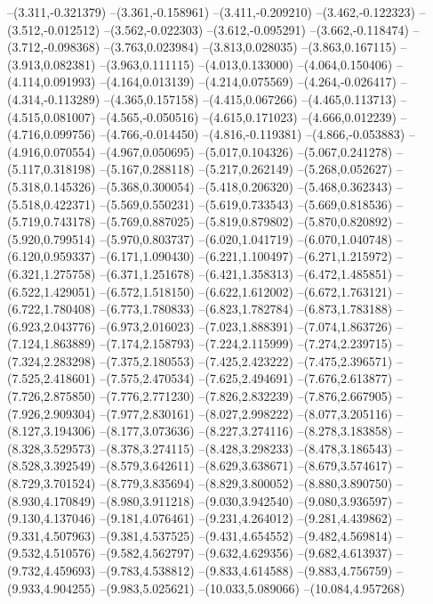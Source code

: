 --(3.311,-0.321379)
--(3.361,-0.158961)
--(3.411,-0.209210)
--(3.462,-0.122323)
--(3.512,-0.012512)
--(3.562,-0.022303)
--(3.612,-0.095291)
--(3.662,-0.118474)
--(3.712,-0.098368)
--(3.763,0.023984)
--(3.813,0.028035)
--(3.863,0.167115)
--(3.913,0.082381)
--(3.963,0.111115)
--(4.013,0.133000)
--(4.064,0.150406)
--(4.114,0.091993)
--(4.164,0.013139)
--(4.214,0.075569)
--(4.264,-0.026417)
--(4.314,-0.113289)
--(4.365,0.157158)
--(4.415,0.067266)
--(4.465,0.113713)
--(4.515,0.081007)
--(4.565,-0.050516)
--(4.615,0.171023)
--(4.666,0.012239)
--(4.716,0.099756)
--(4.766,-0.014450)
--(4.816,-0.119381)
--(4.866,-0.053883)
--(4.916,0.070554)
--(4.967,0.050695)
--(5.017,0.104326)
--(5.067,0.241278)
--(5.117,0.318198)
--(5.167,0.288118)
--(5.217,0.262149)
--(5.268,0.052627)
--(5.318,0.145326)
--(5.368,0.300054)
--(5.418,0.206320)
--(5.468,0.362343)
--(5.518,0.422371)
--(5.569,0.550231)
--(5.619,0.733543)
--(5.669,0.818536)
--(5.719,0.743178)
--(5.769,0.887025)
--(5.819,0.879802)
--(5.870,0.820892)
--(5.920,0.799514)
--(5.970,0.803737)
--(6.020,1.041719)
--(6.070,1.040748)
--(6.120,0.959337)
--(6.171,1.090430)
--(6.221,1.100497)
--(6.271,1.215972)
--(6.321,1.275758)
--(6.371,1.251678)
--(6.421,1.358313)
--(6.472,1.485851)
--(6.522,1.429051)
--(6.572,1.518150)
--(6.622,1.612002)
--(6.672,1.763121)
--(6.722,1.780408)
--(6.773,1.780833)
--(6.823,1.782784)
--(6.873,1.783188)
--(6.923,2.043776)
--(6.973,2.016023)
--(7.023,1.888391)
--(7.074,1.863726)
--(7.124,1.863889)
--(7.174,2.158793)
--(7.224,2.115999)
--(7.274,2.239715)
--(7.324,2.283298)
--(7.375,2.180553)
--(7.425,2.423222)
--(7.475,2.396571)
--(7.525,2.418601)
--(7.575,2.470534)
--(7.625,2.494691)
--(7.676,2.613877)
--(7.726,2.875850)
--(7.776,2.771230)
--(7.826,2.832239)
--(7.876,2.667905)
--(7.926,2.909304)
--(7.977,2.830161)
--(8.027,2.998222)
--(8.077,3.205116)
--(8.127,3.194306)
--(8.177,3.073636)
--(8.227,3.274116)
--(8.278,3.183858)
--(8.328,3.529573)
--(8.378,3.274115)
--(8.428,3.298233)
--(8.478,3.186543)
--(8.528,3.392549)
--(8.579,3.642611)
--(8.629,3.638671)
--(8.679,3.574617)
--(8.729,3.701524)
--(8.779,3.835694)
--(8.829,3.800052)
--(8.880,3.890750)
--(8.930,4.170849)
--(8.980,3.911218)
--(9.030,3.942540)
--(9.080,3.936597)
--(9.130,4.137046)
--(9.181,4.076461)
--(9.231,4.264012)
--(9.281,4.439862)
--(9.331,4.507963)
--(9.381,4.537525)
--(9.431,4.654552)
--(9.482,4.569814)
--(9.532,4.510576)
--(9.582,4.562797)
--(9.632,4.629356)
--(9.682,4.613937)
--(9.732,4.459693)
--(9.783,4.538812)
--(9.833,4.614588)
--(9.883,4.756759)
--(9.933,4.904255)
--(9.983,5.025621)
--(10.033,5.089066)
--(10.084,4.957268)
